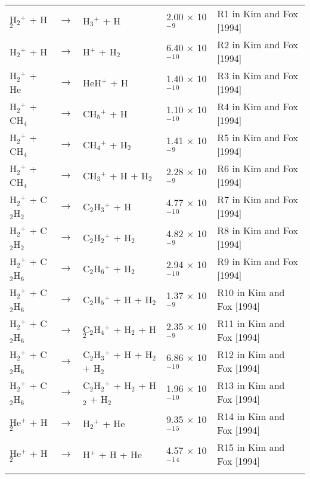 \documentclass[10pt,a4paper]{jarticle}
\begin{document}
\begin{table}[htb]
{\begin{tabular}{lclll}
 H$_2$$^+$   + H$_2$       & $\rightarrow$ & H$_3$$^+$   + H             & 2.00 $\times$ 10$^-$$^9$ & R1 in Kim and Fox [1994] \\
 H$_2$$^+$   + H        & $\rightarrow$ & H$^+$    + H$_2$            & 6.40 $\times$ 10$^-$$^1$$^0$ & R2 in Kim and Fox [1994] \\
 H$_2$$^+$   + He       & $\rightarrow$ & HeH$^+$  + H             & 1.40 $\times$ 10$^-$$^1$$^0$ & R3 in Kim and Fox [1994] \\
 H$_2$$^+$   + CH$_4$      & $\rightarrow$ & CH$_5$$^+$  + H             & 1.10 $\times$ 10$^-$$^1$$^0$ & R4 in Kim and Fox [1994] \\
 H$_2$$^+$   + CH$_4$      & $\rightarrow$ & CH$_4$$^+$  + H$_2$            & 1.41 $\times$ 10$^-$$^9$ & R5 in Kim and Fox [1994] \\
 H$_2$$^+$   + CH$_4$      & $\rightarrow$ & CH$_3$$^+$  + H   + H$_2$      & 2.28 $\times$ 10$^-$$^9$ & R6 in Kim and Fox [1994] \\
 H$_2$$^+$   + C$_2$H$_2$     & $\rightarrow$ & C$_2$H$_3$$^+$ + H             & 4.77 $\times$ 10$^-$$^1$$^0$ & R7 in Kim and Fox [1994] \\
 H$_2$$^+$   + C$_2$H$_2$     & $\rightarrow$ & C$_2$H$_2$$^+$ + H$_2$            & 4.82 $\times$ 10$^-$$^9$ & R8 in Kim and Fox [1994] \\
 H$_2$$^+$   + C$_2$H$_6$     & $\rightarrow$ & C$_2$H$_6$$^+$ + H$_2$            & 2.94 $\times$ 10$^-$$^1$$^0$ & R9 in Kim and Fox [1994] \\
 H$_2$$^+$   + C$_2$H$_6$     & $\rightarrow$ & C$_2$H$_5$$^+$ + H   + H$_2$      & 1.37 $\times$ 10$^-$$^9$ & R10 in Kim and Fox [1994] \\
 H$_2$$^+$   + C$_2$H$_6$     & $\rightarrow$ & C$_2$H$_4$$^+$ + H$_2$  + H$_2$      & 2.35 $\times$ 10$^-$$^9$ & R11 in Kim and Fox [1994] \\
 H$_2$$^+$   + C$_2$H$_6$     & $\rightarrow$ & C$_2$H$_3$$^+$ + H   + H$_2$ + H$_2$ & 6.86 $\times$ 10$^-$$^1$$^0$ & R12 in Kim and Fox [1994] \\
 H$_2$$^+$   + C$_2$H$_6$     & $\rightarrow$ & C$_2$H$_2$$^+$ + H$_2$  + H$_2$ + H$_2$ & 1.96 $\times$ 10$^-$$^1$$^0$ & R13 in Kim and Fox [1994] \\
 He$^+$   + H$_2$       & $\rightarrow$ & H$_2$$^+$   + He            & 9.35 $\times$ 10$^-$$^1$$^5$ & R14 in Kim and Fox [1994] \\
 He$^+$   + H$_2$       & $\rightarrow$ & H$^+$    + H   + He      & 4.57 $\times$ 10$^-$$^1$$^4$ & R15 in Kim and Fox [1994] \\
$$
\end{tabular}}
\end{table}
\end{document}

